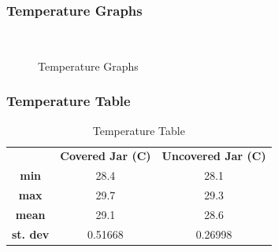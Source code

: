 \documentclass[a4paper, 12pt, english]{article}
\begin{document}
\subsubsection{Temperature Graphs}
\begin{figure}[!ht]
	\centering
	\\
	\qquad
	\qquad
	\caption{Temperature Graphs}
	\label{fig:TempGraphs}
\end{figure}

\subsubsection{Temperature Table}

\begin{table}[!ht]
	\caption{\label{tab:Table 1} Temperature Table}
	\centering
	\begin{tabular}{c c c}
		\toprule
		  & \textbf{Covered Jar (\degree C)}
		  & \textbf{Uncovered Jar (\degree C)}        \\
		\cmidrule[0.4pt](r{0.125em}){1-1}%
		\cmidrule[0.4pt](lr{0.125em}){2-2}%
		\cmidrule[0.4pt](lr{0.125em}){3-3}%
		\textbf{min}     & 28.4                    & 28.1                      \\
		\textbf{max}     & 29.7                    & 29.3                      \\
		\textbf{mean}    & 29.1                    & 28.6                      \\
		\textbf{st. dev} & 0.51668                 & 0.26998
	\end{tabular}
\end{table}
\end{document}
